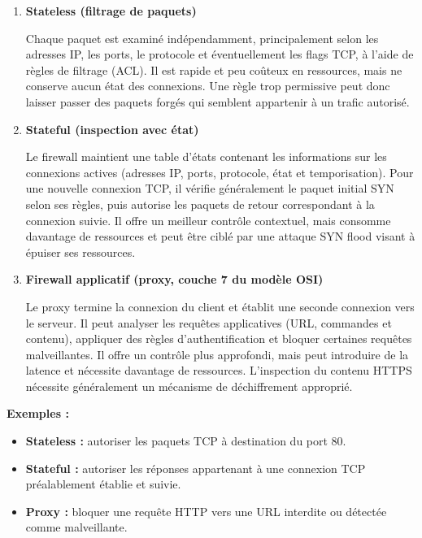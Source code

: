\documentclass[12pt,a4paper]{article}
\begin{document}
\begin{enumerate}
    \item \textbf{Stateless (filtrage de paquets)}

    Chaque paquet est examiné indépendamment, principalement selon les
    adresses IP, les ports, le protocole et éventuellement les flags
    TCP, à l'aide de règles de filtrage (ACL). Il est rapide et peu
    coûteux en ressources, mais ne conserve aucun état des connexions.
    Une règle trop permissive peut donc laisser passer des paquets
    forgés qui semblent appartenir à un trafic autorisé.

    \item \textbf{Stateful (inspection avec état)}

    Le firewall maintient une table d'états contenant les informations
    sur les connexions actives (adresses IP, ports, protocole, état et
    temporisation). Pour une nouvelle connexion TCP, il vérifie
    généralement le paquet initial SYN selon ses règles, puis autorise
    les paquets de retour correspondant à la connexion suivie. Il offre
    un meilleur contrôle contextuel, mais consomme davantage de
    ressources et peut être ciblé par une attaque SYN flood visant à
    épuiser ses ressources.

    \item \textbf{Firewall applicatif (proxy, couche 7 du modèle OSI)}

    Le proxy termine la connexion du client et établit une seconde
    connexion vers le serveur. Il peut analyser les requêtes
    applicatives (URL, commandes et contenu), appliquer des règles
    d'authentification et bloquer certaines requêtes malveillantes. Il
    offre un contrôle plus approfondi, mais peut introduire de la
    latence et nécessite davantage de ressources. L'inspection du
    contenu HTTPS nécessite généralement un mécanisme de déchiffrement
    approprié.
\end{enumerate}

\textbf{Exemples :}
\begin{itemize}
    \item \textbf{Stateless :} autoriser les paquets TCP à destination
    du port 80.
    \item \textbf{Stateful :} autoriser les réponses appartenant à une
    connexion TCP préalablement établie et suivie.
    \item \textbf{Proxy :} bloquer une requête HTTP vers une URL
    interdite ou détectée comme malveillante.
\end{itemize}
\end{document}
